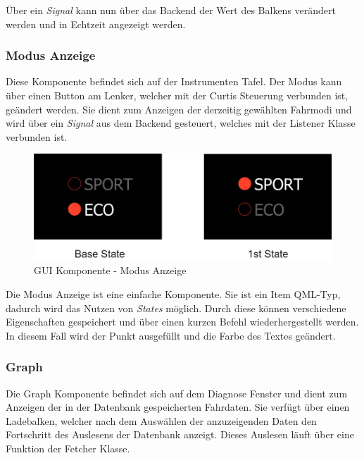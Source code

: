 Über ein \textit{Signal} kann nun über das Backend der Wert des Balkens verändert werden und in Echtzeit angezeigt werden.

\subsubsection{Modus Anzeige}
Diese Komponente befindet sich auf der Instrumenten Tafel. Der Modus kann über einen Button am Lenker, welcher mit der Curtis Steuerung verbunden ist, geändert werden. Sie dient zum Anzeigen der derzeitig gewählten Fahrmodi und wird über ein \textit{Signal} aus dem Backend gesteuert, welches mit der Listener Klasse verbunden ist.

\begin{figure}[H]
	\begin{center}
		\includegraphics[scale=0.4]{figures/hcis/component_mode.png}
		\caption{GUI Komponente - Modus Anzeige}
				\label{fig:kompModus}
	\end{center}
\end{figure}

Die Modus Anzeige ist eine einfache Komponente. Sie ist ein Item QML-Typ, dadurch wird das Nutzen von \textit{States} möglich. Durch diese können verschiedene Eigenschaften gespeichert und über einen kurzen Befehl wiederhergestellt werden.\\
In diesem Fall wird der Punkt ausgefüllt und die Farbe des Textes geändert.

\newpage

\subsubsection{Graph} \label{sec:graph}

Die Graph Komponente befindet sich auf dem Diagnose Fenster und dient zum Anzeigen der in der Datenbank gespeicherten Fahrdaten. Sie verfügt über einen Ladebalken, welcher nach dem Auswählen der anzuzeigenden Daten den Fortschritt des Auslesens der Datenbank anzeigt. Dieses Auslesen läuft über eine Funktion der Fetcher Klasse.


